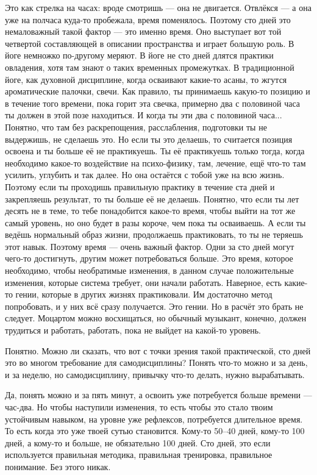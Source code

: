 Это
как стрелка на часах:
вроде смотришь --- она не двигается. Отвлёкся --- а она уже на полчаса куда-то пробежала, время
поменялось. Поэтому сто дней это немаловажный такой фактор --- это именно время.
Оно выступает вот той
четвертой составляющей
в описании пространства и играет большую
роль.\hfil\break
\indent
В йоге немножко по-другому меряют. В йоге не сто дней длятся практики овладения,
хотя там знают о таких временных промежутках. В традиционной
йоге, как духовной
дисциплине, когда осваивают какие-то асаны, то жгутся ароматические палочки, свечи.
Как правило, ты
принимаешь какую-то
позицию и в течение того времени, пока горит эта свечка, примерно два с половиной часа
ты должен в этой
позе находиться.
И когда ты эти два с половиной часа... Понятно, что там без раскрепощения, расслабления,
подготовки ты не выдержишь,
не сделаешь это. Но если ты это делаешь, то считается позиция освоена и ты больше её не
практикуешь. Ты её
практикуешь только тогда, когда необходимо какое-то воздействие на психо-физику, там,
лечение, ещё что-то там
усилить, углубить и так далее. Но она остаётся с тобой уже на всю жизнь. Поэтому если ты
проходишь правильную практику в течение
ста дней и закрепляешь результат, то ты больше её не делаешь.\hfil\break
\indent
Понятно, что если ты лет десять не в теме, то тебе понадобится какое-то время, чтобы выйти на
тот
же самый уровень, но
оно будет в разы короче, чем пока ты осваиваешь. А если ты ведёшь нормальный образ жизни,
продолжаешь
практиковать, то ты не теряешь этот навык.\hfil\break
\indent
Поэтому время --- очень важный фактор. Одни за сто дней могут чего-то достигнуть, другим
может потребоваться больше.
Это время, которое необходимо, чтобы необратимые изменения, в данном случае
положительные изменения, которые
система требует, они начали работать.\hfil\break
\indent
Наверное, есть какие-то гении, которые в других жизнях практиковали. Им достаточно метод
попробовать, и у них всё сразу получается. Это гении. Но в расчёт это брать не следует.
Моцартом можно
восхищаться, но
обычный музыкант, конечно, должен трудиться и работать, работать, пока не выйдет на
какой-то уровень.

\A
Понятно. Можно ли сказать, что вот с точки зрения такой практической, сто дней это во многом
требование для
самодисциплины? Понять что-то можно и за день, и за неделю, но самодисциплину,
привычку что-то делать, нужно вырабатывать.

\T
Да, понять можно и за пять минут, а освоить уже потребуется больше времени --- час-два.
Но чтобы наступили
изменения, то есть чтобы это стало твоим устойчивым навыком, на уровне
уже рефлексов,
потребуется длительное время. То есть когда это уже твоей сутью становится.
Кому-то 50--40 дней, кому-то 100 дней, а
кому-то и больше, не
обязательно 100 дней. Сто дней, это если используется правильная методика, правильная тренировка,
правильное понимание.
Без этого никак.

